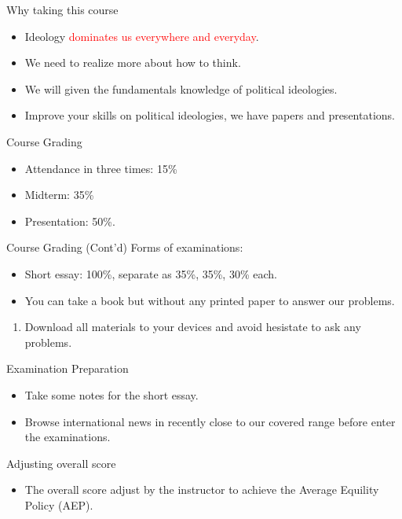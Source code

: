 \documentclass{beamer}
\begin{document}
\begin{frame}{Why taking this course}
\begin{itemize}
\item Ideology \textcolor{red}{dominates us everywhere and everyday}.
\item We need to realize more about how to think.
\item We will given the fundamentals knowledge of political ideologies.
\item Improve your skills on political ideologies, we have papers and presentations.
\end{itemize}
\end{frame}
\begin{frame}{Course Grading}
\begin{itemize}
\item Attendance in three times: 15\%
\item Midterm: 35\%
\item Presentation: 50\%.
\end{itemize}
\end{frame}
\begin{frame}{Course Grading (Cont'd)}
Forms of examinations:
\begin{itemize}
\item Short essay: 100\%, separate as 35\%, 35\%, 30\% each.
\item You can take a book but without any printed paper to answer our problems.
\end{itemize}
\begin{enumerate}
\item Download all materials to your devices and avoid hesistate to ask any problems.
\end{enumerate}
\end{frame}
\begin{frame}{Examination Preparation}
\begin{itemize}
\item Take some notes for the short essay.
\item Browse international news in recently close to our covered range before enter the examinations.
\end{itemize}
\begin{block}{Adjusting overall score}
\begin{itemize}
\item The overall score adjust by the instructor to achieve the Average Equility Policy (AEP).
\end{itemize}
\end{block}
\end{frame}
\end{document}
